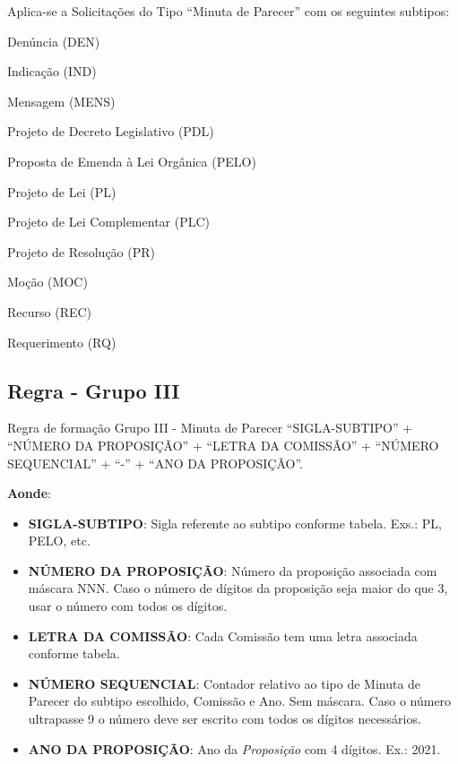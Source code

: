 \begin{env-aplica}{Aplica-se a Solicitações do Tipo ``Minuta de Parecer'' com os seguintes subtipos:}
	\item Denúncia (DEN)
	\item Indicação (IND)
	\item Mensagem (MENS) 
	\item Projeto de Decreto Legislativo (PDL)
	\item Proposta de Emenda à Lei Orgânica (PELO)
	\item Projeto de Lei (PL)
	\item Projeto de Lei Complementar (PLC) 
	\item Projeto de Resolução (PR)
	\item Moção (MOC)
	\item Recurso (REC)
	\item Requerimento (RQ)		
\end{env-aplica}

\subsection{Regra - Grupo III}

\begin{env-regra}{Regra de formação Grupo III - Minuta de Parecer}
	``SIGLA-SUBTIPO'' + ``NÚMERO DA PROPOSIÇÃO'' + ``LETRA DA COMISSÃO'' + ``NÚMERO SEQUENCIAL'' + ``-''  + ``ANO DA PROPOSIÇÃO''.
\end{env-regra}

\textbf{Aonde}:

\begin{itemize}
	\item \textbf{SIGLA-SUBTIPO}: Sigla referente ao subtipo conforme tabela. Exs.: PL, PELO, etc.


	\item \textbf{NÚMERO DA PROPOSIÇÃO}: Número da proposição associada com máscara NNN. Caso o número de dígitos da proposição seja maior do que 3, usar o número com todos os dígitos.
	
	\item \textbf{LETRA DA COMISSÃO}: Cada Comissão tem uma letra associada conforme tabela. 
	
	\item \textbf{NÚMERO SEQUENCIAL}: Contador relativo ao tipo de Minuta de Parecer do subtipo escolhido, Comissão e Ano. Sem máscara. Caso o número ultrapasse 9 o número deve ser escrito com todos os dígitos necessários. 	
	
	\item \textbf{ANO DA PROPOSIÇÃO}: Ano da \emph{Proposição} com 4 dígitos. Ex.: 2021.
\end{itemize}

